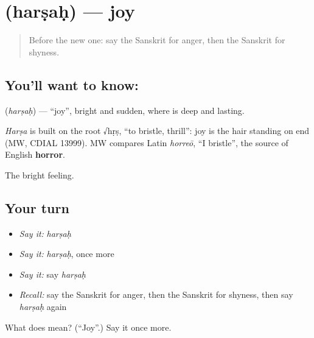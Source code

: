 \section[\texorpdfstring{\sk{हर्षः} (harṣaḥ)}{हर्षः (harṣaḥ)}]{ (harṣaḥ) — joy}

\label{lesson:SA-C68-joy}



\begin{quote}
Before the new one: say the Sanskrit for anger, then the Sanskrit for shyness.
\end{quote}

\subsection*{You'll want to know: }
\textbf{} (\emph{harṣaḥ}) — \textquotedblleft{}joy\textquotedblright{}, bright and sudden, where \textbf{} is deep and lasting.

\begin{cousinweb}
\emph{Harṣa} is built on the root √hṛṣ, \textquotedblleft{}to bristle, thrill\textquotedblright{}: joy is the hair standing on end (MW, CDIAL 13999). MW compares Latin \emph{horreō}, \textquotedblleft{}I bristle\textquotedblright{}, the source of English \textbf{horror}.
\end{cousinweb}

\begin{grammarlens}[title={What you've built}]
The bright feeling.
\end{grammarlens}

\subsection*{Your turn}
\begin{itemize}
\raggedright
  \item \emph{Say it:} \emph{harṣaḥ}
  \item \emph{Say it:} \emph{harṣaḥ}, once more
  \item \emph{Say it:} say \emph{harṣaḥ}
  \item \emph{Recall:} say the Sanskrit for anger, then the Sanskrit for shyness, then say \emph{harṣaḥ} again
\end{itemize}

\begin{tcolorbox}[breakable,colback=teal!4,colframe=teal!35!black,title={Before you move on}]
What does  mean? (\textquotedblleft{}Joy\textquotedblright{}.) Say it once more.
\end{tcolorbox}
